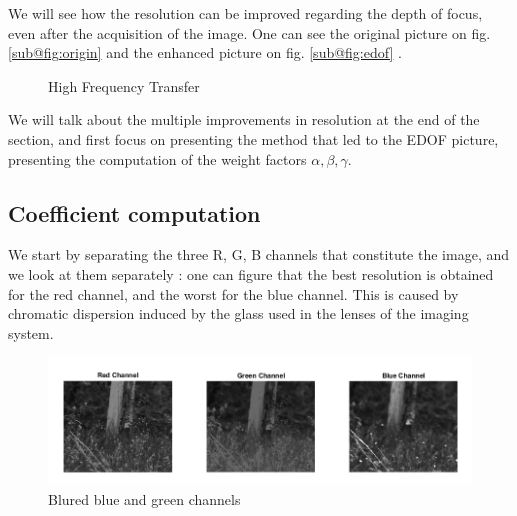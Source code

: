 \documentclass[10pt,letterpaper]{article}
\begin{document}
We will see how the resolution can be improved regarding the depth of focus, even after the acquisition of the image. One can see the original picture on fig. \ref{sub@fig:origin} and the enhanced picture on fig. \ref{sub@fig:edof} .

\begin{figure}[h]
    \centering
	\caption{High Frequency Transfer}
\end{figure}

We will talk about the multiple improvements in resolution at the end of the section, and first focus on presenting the method that led to the EDOF picture, presenting the computation of the weight factors $\alpha, \beta, \gamma$.

\subsection*{Coefficient computation}
We start by separating the three R, G, B channels that constitute the image, and we look at them separately : one can figure that the best resolution is obtained for the red channel, and the worst for the blue channel. This is caused by chromatic dispersion induced by the glass used in the lenses of the imaging system.

\begin{figure}[h]
	\centering
	\includegraphics[scale=0.45]{Channels Original and Blured DOF.png}
	\caption{Blured blue and green channels}
	\label{fig:blured-channels}
\end{figure}
\end{document}
